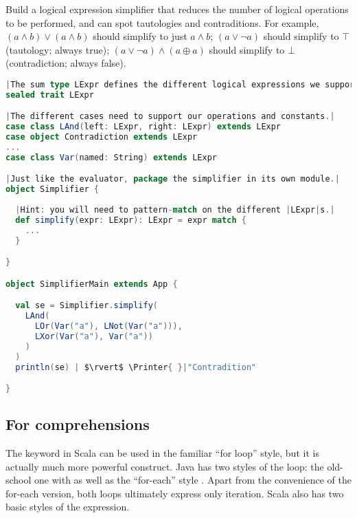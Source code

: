 \documentclass[10 pt]{article}
\begin{document}
\begin{example}
Build a logical expression simplifier that reduces the number of logical operations to be performed, and can spot tautologies and contraditions. For example, $(a \land b) \lor (a \land b)$ should simplify to just $a \land b$; $(a \lor \lnot{a})$ should simplify to $\top$ (tautology; always true); $(a \lor \lnot{a}) \land (a \oplus a)$ should simplify to $\bot$ (contradiction; always false).

\begin{lstlisting}[caption={Logical expression simplifier}, label={code:ls}, language=Scala, escapechar=|]
|The sum type LExpr defines the different logical expressions we support.|
sealed trait LExpr

|The different cases need to support our operations and constants.|
case class LAnd(left: LExpr, right: LExpr) extends LExpr
case object Contradiction extends LExpr
...
case class Var(named: String) extends LExpr

|Just like the evaluator, package the simplifier in its own module.|
object Simplifier {
    
  |Hint: you will need to pattern-match on the different |LExpr|s.|
  def simplify(expr: LExpr): LExpr = expr match {
    ...
  }

}

object SimplifierMain extends App {

  val se = Simplifier.simplify(
    LAnd(
      LOr(Var("a"), LNot(Var("a"))),
      LXor(Var("a"), Var("a"))
    )
  )
  println(se) | $\rvert$ \Printer{ }|"Contradition"

}
\end{lstlisting}
\end{example}

\subsection{For comprehensions}
The  keyword in Scala can be used in the familiar ``for loop'' style, but it is actually much more powerful construct. Java has two styles of the  loop: the old-school one with  as well as the ``for-each'' style . Apart from the convenience of the for-each version, both loops ultimately express only iteration. Scala also has two basic styles of the  expression.
\end{document}
